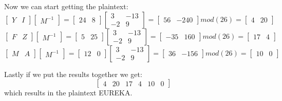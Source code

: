 \documentclass[12pt,letterpaper,final]{report}
\begin{document}
\bigskip Now we can start getting the plaintext: 
\[\begin{bmatrix} Y &I\end{bmatrix}\begin{bmatrix} M^{-1}\end{bmatrix} = \begin{bmatrix} 24 &8\end{bmatrix}\begin{bmatrix} 3 &-13 \\ -2 & 9  \end{bmatrix}= \begin{bmatrix} 56 &-240\end{bmatrix} mod (26) = \begin{bmatrix} 4 &20\end{bmatrix}\]
\[\begin{bmatrix} F &Z\end{bmatrix}\begin{bmatrix} M^{-1}\end{bmatrix}= \begin{bmatrix} 5 &25\end{bmatrix}\begin{bmatrix} 3 &-13 \\ -2 & 9  \end{bmatrix}= \begin{bmatrix} -35 &160\end{bmatrix} mod (26) = \begin{bmatrix} 17 &4\end{bmatrix}\]
\[\begin{bmatrix} M &A\end{bmatrix}\begin{bmatrix} M^{-1}\end{bmatrix}= \begin{bmatrix} 12 &0\end{bmatrix}\begin{bmatrix} 3 &-13 \\ -2 & 9  \end{bmatrix}= \begin{bmatrix} 36 &-156\end{bmatrix} mod (26) = \begin{bmatrix} 10 &0\end{bmatrix}\]

\bigskip Lastly if we put the results together we get: \[\begin{bmatrix} 4 &20 &17 &4 &10 &0\end{bmatrix}\] \bigskip which results in the plaintext EUREKA. 
\end{document}
